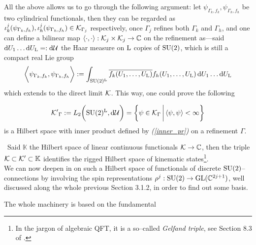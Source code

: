 All the above allows us to go through the following argument: let $\psi_{\Gamma_k,f_k},\psi_{\Gamma_h,f_h}$ be two cylindrical functionals, then they can be regarded as $\iota_k^j(\psi_{\Gamma_k,f_h}), \iota^j_h(\psi_{\Gamma_h,f_h})\in\mathcal{K}_{\Gamma_j}$ respectively, once $\Gamma_j$ refines both $\Gamma_k$ and $\Gamma_h$, and one can define a bilinear map $\langle\cdot,\cdot\rangle:\mathcal{K}_j\times\mathcal{K}_j\to\mathbb{C}$ on the refinement as---said $\text{\normalfont d} U_1\hdots\text{\normalfont d} U_{\text{\normalfont L}}=:\text{\normalfont d}\mathcal{U}$ the Haar measure on $\text{\normalfont L}$ copies of $\text{\normalfont SU}(2)$, which is still a compact real Lie group
\begin{equation}\label{inner_pr}
\bigg\langle\psi_{\Gamma_k,f_k},\psi_{\Gamma_h,f_h}\bigg\rangle:=\int_{\text{\normalfont SU}(2)^{\text{\normalfont L}}}\overline{f_k(U_1,\hdots,U_{\text{\normalfont L}})}f_h(U_1,\hdots,U_{\text{\normalfont L}})\,\text{\normalfont d} U_1\hdots\text{\normalfont d} U_{\text{\normalfont L}}
\end{equation}
which extends to the direct limit $\mathcal{K}$. This way, one could prove the following
\begin{teo}
    $${\mathcal{K}'}_\Gamma:=L_2\bigg(\text{\normalfont SU}(2)^{\text{\normalfont L}},\text{\normalfont d}\mathcal{U}\bigg)=\bigg\{\psi\in\mathcal{K}_\Gamma\,\bigg|\,\langle\psi,\psi\rangle<\infty\bigg\}$$
    is a Hilbert space with inner product defined by \emph{(\ref{inner_pr})} on a refinement $\Gamma$.
\end{teo}
\,\newline
Said $\mathbb{K}$ the Hilbert space of linear continuous functionals $\mathcal{K}\to\mathbb{C}$, then the triple $\mathcal{K}\subset\mathcal{K}'\subset\mathbb{K}$ identifies the rigged Hilbert space of kinematic states\footnote{In the jargon of algebraic QFT, it is a so--called \emph{Gelfand triple}, see Section 8.3 of \cite{moretti}.}.\\

We can now deepen in on such a Hilbert space of functionals of discrete $\text{\normalfont SU}(2)$--connections by involving the spin representations $\rho^{j}:\text{\normalfont SU}(2)\to\text{\normalfont GL}(\mathbb{C}^{2j+1})$, well discussed along the whole previous Section 3.1.2, in order to find out some basis. 

The whole machinery is based on the fundamental 


